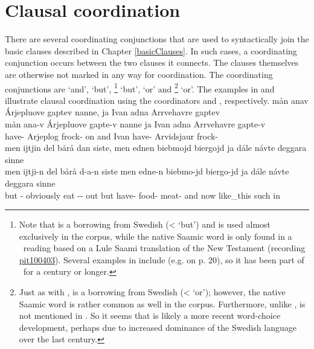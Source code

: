 \section{Clausal coordination}\label{clausalCoordination}
There are several coordinating conjunctions that are used to syntactically join the basic clauses described in Chapter \ref{basicClauses}. In such cases, a coordinating conjunction occurs between the two clauses it connects. The clauses themselves are otherwise not marked in any way for coordination. The coordinating conjunctions are  ‘and’,  ‘but’, \footnote{Note that  is a borrowing from Swedish (<  ‘but’) and is used almost exclusively in the corpus, while the native Saamic word  is only found in a \PS\ reading based on a Lule Saami translation of the New Testament (recording \hyperlink{pit100403}{pit100403}). Several examples in \citet{Lagercrantz1926} include  (e.g. on p. 20), so it has been part of \PS\ for a century or longer.} 
‘but’,  ‘or’ and \footnote{Just as with ,  is a borrowing from Swedish (<  ‘or’); however, the native Saamic word  is rather common as well in the corpus. Furthermore, unlike ,  is not mentioned in \citet{Lagercrantz1926}. So it seems that  is likely a more recent word-choice development, perhaps due to increased dominance of the Swedish language over the last century.} 
‘or’. The examples in  and  illustrate clausal coordination using the coordinators  and , respectively.
\ea\label{coordination1}
\glll	mån anav Árjepluove gaptev nanne, ja Ivan adna Arrvehavre gaptev\\
	mån ana-v Árjepluove gapte-v nanne ja Ivan adna Arrvehavre gapte-v\\
	 have- Arjeplog\BS{} frock- on and Ivan have- Arvidsjaur\BS{} frock-\\\nopagebreak
{} 
\z
\ea\label{coordination2}
\glll	men ijtjin del bårå dan siste, men ednen biebmojd biergojd ja dále návte deggara sinne\\
	men ijtji-n del bårå d-a-n siste men edne-n biebmo-jd biergo-jd ja dále návte deggara sinne\\
	but - obviously eat\BS{} -- out but have- food- meat- and now like\_this such\BS{} in\\\nopagebreak
{} 
\z

